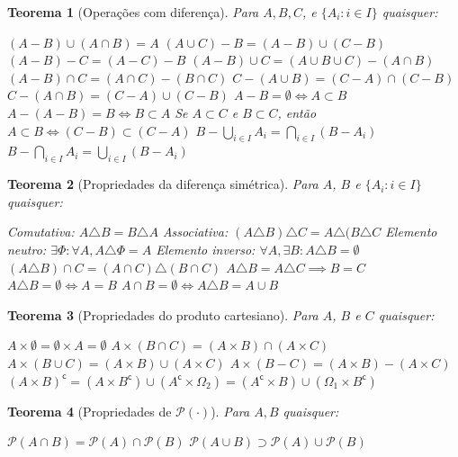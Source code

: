 \documentclass[12pt,a4paper,answers]{article}
\numberwithin{equation}{section} %
\newcommand{\cp}[1]{#1^\mathsf{c}} %
\theoremstyle{thm_estilo}
\newtheorem{theorem}{Teorema}[section]
\theoremstyle{thm_note_est}
\begin{document}
\begin{theorem}[Operações com diferença]
	Para $A,B,C$, e $\{A_i: i \in I\}$ quaisquer:	
	\begin{outline}[enumerate]
		\1 \( (A-B)\cup(A\cap B) = A\)
		\1 \( (A\cup C) - B = (A-B)\cup(C-B) \)
		\1 \( (A-B)-C = (A-C)-B \)
		\1 \((A-B)\cup C = (A\cup B \cup C) - (A\cap B)\)
		\1 \((A-B)\cap C = (A\cap C) - (B\cap C)\)
		\1 \(C-(A\cup B) = (C-A)\cap(C-B)\)
		\1 \(C-(A\cap B) = (C-A)\cup(C-B)\)
		\1 \(A-B=\emptyset \iff A \subset B\)
		\1 \( A-(A-B)=B \iff B\subset A\) 
		\1 Se $A\subset C$ e $B\subset C$, então $A\subset B \iff (C-B)\subset(C-A)$ 
		\1 \( B - \bigcup_{i\in I}A_i = \bigcap_{i\in I}(B-A_i) \)
		\1 \( B - \bigcap_{i\in I}A_i = \bigcup_{i\in I}(B-A_i) \)
	\end{outline}
\end{theorem}

\begin{theorem}[Propriedades da diferença simétrica]
	Para $A$, $B$ e $\{A_i: i \in I\}$ quaisquer:	
	\begin{outline}[enumerate]
		\1 Comutativa: \( A \triangle B = B\triangle A \)
		\1 Associativa: \( (A\triangle B)\triangle C = A\triangle(B\triangle C \)
		\1 Elemento neutro: \(\exists \Phi : \forall A, A\triangle\Phi = A \)
		\1 Elemento inverso: \(\forall A, \exists B: A\triangle B = \emptyset \)
		\1 \( (A\triangle B)\cap C = (A\cap C)\triangle(B\cap C) \)
		\1 \( A\triangle B = A\triangle C \implies B=C\)
		\1 \( A\triangle B = \emptyset \iff A=B\)
		\1 \( A\cap B = \emptyset \iff A\triangle B = A\cup B \)
	\end{outline}
\end{theorem}

\begin{theorem}[Propriedades do produto cartesiano]
	Para $A$, $B$ e $C$ quaisquer:
	\begin{outline}[enumerate]
		\1 \( A\times\emptyset = \emptyset \times A = \emptyset \)
		\1 \( A\times(B\cap C) = (A\times B)\cap(A\times C) \)
		\1 \( A\times(B\cup C) = (A\times B)\cup(A\times C) \)
		\1 \( A\times(B-C) = (A\times B)-(A\times C) \)
		\1 \( \cp{(A\times B)} = (A\times \cp{B})\cup(\cp{A}\times \Omega_2) 
		=  (\cp{A}\times B)\cup(\Omega_1 \times \cp{B}) \)
	\end{outline}
\end{theorem}

\begin{theorem}[Propriedades de $\mathcal{P}(\cdot)$] Para $A,B$ quaisquer:
\end{theorem}
	\begin{outline}[enumerate]
		\1 \( \mathcal{P}(A\cap B) = \mathcal{P}(A)\cap\mathcal{P}(B)\)
		\1 \( \mathcal{P}(A\cup B) \supset \mathcal{P}(A)\cup\mathcal{P}(B)\) 
	\end{outline}
\end{document}
